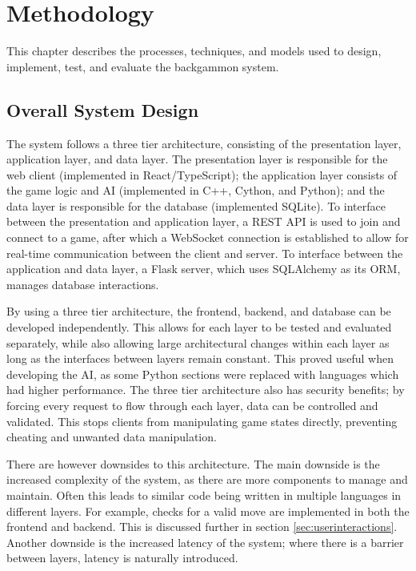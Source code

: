 \chapter{Methodology}

This chapter describes the processes, techniques, and models used to design, implement, test, and evaluate the backgammon system.

\section{Overall System Design}
The system follows a three tier architecture, consisting of the presentation layer, application layer, and data layer. The presentation layer is responsible for the web client (implemented in React/TypeScript); the application layer consists of the game logic and AI (implemented in C++, Cython, and Python); and the data layer is responsible for the database (implemented SQLite). To interface between the presentation and application layer, a REST API is used to join and connect to a game, after which a WebSocket connection is established to allow for real-time communication between the client and server. To interface between the application and data layer, a Flask server, which uses SQLAlchemy as its ORM, manages database interactions.

By using a three tier architecture, the frontend, backend, and database can be developed independently. This allows for each layer to be tested and evaluated separately, while also allowing large architectural changes within each layer as long as the interfaces between layers remain constant. This proved useful when developing the AI, as some Python sections were replaced with languages which had higher performance. The three tier architecture also has security benefits; by forcing every request to flow through each layer, data can be controlled and validated. This stops clients from manipulating game states directly, preventing cheating and unwanted data manipulation.

There are however downsides to this architecture. The main downside is the increased complexity of the system, as there are more components to manage and maintain. Often this leads to similar code being written in multiple languages in different layers. For example, checks for a valid move are implemented in both the frontend and backend. This is discussed further in section \ref{sec:userinteractions}.  
Another downside is the increased latency of the system; where there is a barrier between layers, latency is naturally introduced. 

